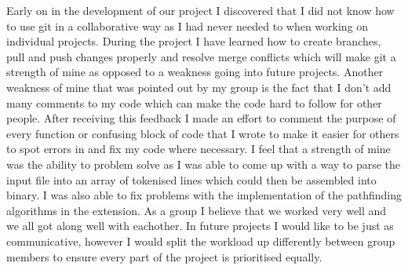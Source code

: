 \documentclass[11pt]{article}
\begin{document}
Early on in the development of our project I discovered that I did not know how to use git in a collaborative way as I had never needed to 
when working on individual projects. During the project I have learned how to create branches, pull and push changes properly and resolve merge conflicts which will 
make git a strength of mine as opposed to a weakness going into future projects.
\newline
Another weakness of mine that was pointed out by my group is the fact that I don't add many comments to my code which can make the code hard to follow for other people.
After receiving this feedback I made an effort to comment the purpose of every function or confusing block of code that I wrote to make it easier for others to spot errors
in and fix my code where necessary.
\newline
I feel that a strength of mine was the ability to problem solve as I was able to come up with a way to parse the input file into an array of tokenised lines which could then
be assembled into binary. I was also able to fix problems with the implementation of the pathfinding algorithms in the extension.   
\newline
As a group I believe that we worked very well and we all got along well with eachother. In future projects I would like to be just as communicative, however I would split the
workload up differently between group members to ensure every part of the project is prioritised equally.
\end{document}
